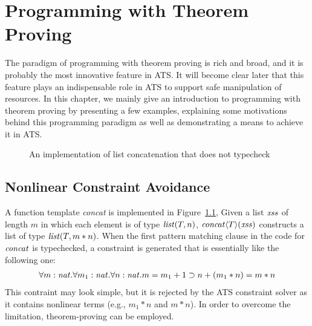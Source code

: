 \chapter{Programming with Theorem Proving}

The paradigm of programming with theorem proving is rich and broad, and it
is probably the most innovative feature in ATS. It will become clear later
that this feature plays an indispensable role in ATS to support safe
manipulation of resources. In this chapter, we mainly give an introduction
to programming with theorem proving by presenting a few examples,
explaining some motivations behind this programming paradigm as well as
demonstrating a means to achieve it in ATS.

\begin{figure}[thp]

\caption{An implementation of list concatenation that does not typecheck}
\label{figure:list_concat_function}
\end{figure}
\section{Nonlinear Constraint Avoidance}
A function template {\it concat} is implemented in
Figure~\ref{figure:list_concat_function}, Given a list ${\it xss}$ of length
$m$ in which each element is of type ${\it list}(T,n)$, ${\it
concat}\langle{T}\rangle({\it xss})$ constructs a list of type
${\it list}(T,m*n)$. When the first pattern matching clause in the code for
${\it concat}$ is typechecked, a constraint is generated that is
essentially like the following one:
\[\begin{array}{l}
\forall{m:{\it nat}}.\forall{m_1:{\it nat}}.\forall{n:{\it nat}}. m=m_1+1\supset n+(m_1*n) = m*n \\
\end{array}\]
This contraint may look simple, but it is rejected by the ATS constraint
solver as it contains nonlinear terms (e.g., $m_1*n$ and $m*n$).
In order to overcome the limitation, theorem-proving can be employed.

